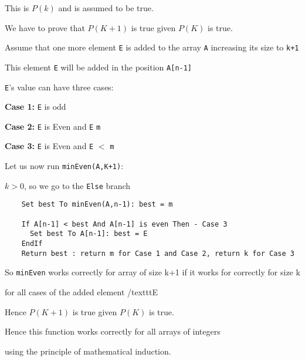 \documentclass{article}
\begin{document}
    This is $P(k)$ and is assumed to be true.

    We have to prove that $P(K+1)$ is true given $P(K)$ is true.

    Assume that one more element \texttt{E} is added to the array \texttt{A} increasing its size to \texttt{k+1}

    This element \texttt{E} will be added in the position \texttt{A[n-1]}

    \texttt{E}'s value  can have three cases:

    \textbf{Case 1:} \texttt{E} is odd

    \textbf{Case 2:} \texttt{E} is Even and \texttt{E} \geq \texttt{m}

    \textbf{Case 3:} \texttt{E} is Even and \texttt{E} $<$ \texttt{m}

    Let us now run \texttt{minEven(A,K+1)}:

    $k > 0$, so we go to the \texttt{Else} branch
    \begin{verbatim}
    Set best To minEven(A,n-1): best = m

    If A[n-1] < best And A[n-1] is even Then - Case 3
      Set best To A[n-1]: best = E
    EndIf
    Return best : return m for Case 1 and Case 2, return k for Case 3
    \end{verbatim}
    So \texttt{minEven} works correctly for array of size k+1 if it works for correctly for size k

    for all cases of the added element /texttt{E}

    Hence $P(K+1)$ is true given $P(K)$ is true.

    Hence this function works correctly for all arrays of integers

    using the principle of mathematical induction.
\end{document}
